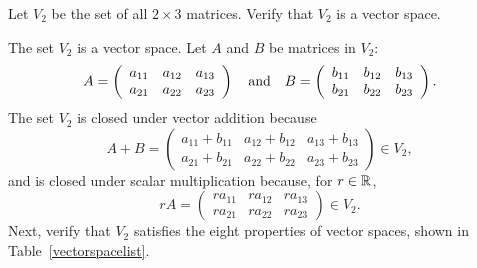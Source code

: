 \documentclass{ximera}
\begin{document}
\begin{exercise} \label{c5.1.2}
Let $V_2$ be the set of all $2\times 3$ matrices.   Verify that
$V_2$ is a vector space.

\begin{solution}

The set $V_2$ is a vector space.
Let $A$ and $B$ be matrices in $V_2$:
\[
A = \left(\begin{array}{rrr} a_{11} & a_{12} & a_{13} \\
a_{21} & a_{22} & a_{23} \end{array}\right) \quad\mbox{and}\quad
B = \left(\begin{array}{rrr} b_{11} & b_{12} & b_{13} \\
b_{21} & b_{22} & b_{23} \end{array}\right).
\]
The set $V_2$ is closed under vector addition because
\[
A + B
= \left(\begin{array}{rrr} a_{11} + b_{11} & a_{12} + b_{12} &
a_{13} + b_{13} \\ a_{21} + b_{21} & a_{22} + b_{22} &
a_{23} + b_{23} \end{array}\right) \in V_2,
\]
and is closed under scalar multiplication because, for $r \in \mbox{$\Bbb{R}$}$,
\[
rA = \left(\begin{array}{rrr} ra_{11} & ra_{12} & ra_{13} \\
ra_{21} & ra_{22} & ra_{23} \end{array}\right) \in V_2.
\]
Next, verify that $V_2$ satisfies the eight properties of vector
spaces, shown in Table~\ref{vectorspacelist}.


\end{solution}
\end{exercise}
\end{document}
